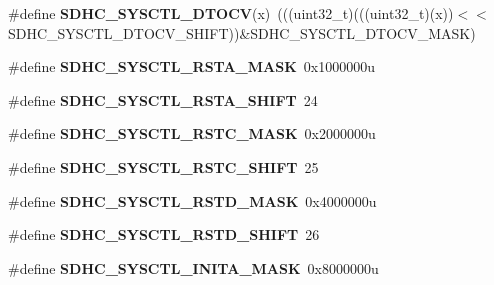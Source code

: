 \begin{DoxyCompactItemize}
\item 
\#define {\bfseries S\+D\+H\+C\+\_\+\+S\+Y\+S\+C\+T\+L\+\_\+\+D\+T\+O\+CV}(x)~(((uint32\+\_\+t)(((uint32\+\_\+t)(x))$<$$<$S\+D\+H\+C\+\_\+\+S\+Y\+S\+C\+T\+L\+\_\+\+D\+T\+O\+C\+V\+\_\+\+S\+H\+I\+FT))\&S\+D\+H\+C\+\_\+\+S\+Y\+S\+C\+T\+L\+\_\+\+D\+T\+O\+C\+V\+\_\+\+M\+A\+SK)\hypertarget{group__SDHC__Register__Masks_ga1e1110144cc16dd7711f8acbd1bfd8b3}{}\label{group__SDHC__Register__Masks_ga1e1110144cc16dd7711f8acbd1bfd8b3}

\item 
\#define {\bfseries S\+D\+H\+C\+\_\+\+S\+Y\+S\+C\+T\+L\+\_\+\+R\+S\+T\+A\+\_\+\+M\+A\+SK}~0x1000000u\hypertarget{group__SDHC__Register__Masks_gab4c8c72837143c46d7c36342c494b4ad}{}\label{group__SDHC__Register__Masks_gab4c8c72837143c46d7c36342c494b4ad}

\item 
\#define {\bfseries S\+D\+H\+C\+\_\+\+S\+Y\+S\+C\+T\+L\+\_\+\+R\+S\+T\+A\+\_\+\+S\+H\+I\+FT}~24\hypertarget{group__SDHC__Register__Masks_gaa5f5e5f66dea7902c53a8cb01ec27fbb}{}\label{group__SDHC__Register__Masks_gaa5f5e5f66dea7902c53a8cb01ec27fbb}

\item 
\#define {\bfseries S\+D\+H\+C\+\_\+\+S\+Y\+S\+C\+T\+L\+\_\+\+R\+S\+T\+C\+\_\+\+M\+A\+SK}~0x2000000u\hypertarget{group__SDHC__Register__Masks_ga10f1184a683dcb78737e3620660d6b62}{}\label{group__SDHC__Register__Masks_ga10f1184a683dcb78737e3620660d6b62}

\item 
\#define {\bfseries S\+D\+H\+C\+\_\+\+S\+Y\+S\+C\+T\+L\+\_\+\+R\+S\+T\+C\+\_\+\+S\+H\+I\+FT}~25\hypertarget{group__SDHC__Register__Masks_ga3d422fd7f88100a1e5ec873d8d670792}{}\label{group__SDHC__Register__Masks_ga3d422fd7f88100a1e5ec873d8d670792}

\item 
\#define {\bfseries S\+D\+H\+C\+\_\+\+S\+Y\+S\+C\+T\+L\+\_\+\+R\+S\+T\+D\+\_\+\+M\+A\+SK}~0x4000000u\hypertarget{group__SDHC__Register__Masks_ga920797e969967edc2e737c8db7ce92aa}{}\label{group__SDHC__Register__Masks_ga920797e969967edc2e737c8db7ce92aa}

\item 
\#define {\bfseries S\+D\+H\+C\+\_\+\+S\+Y\+S\+C\+T\+L\+\_\+\+R\+S\+T\+D\+\_\+\+S\+H\+I\+FT}~26\hypertarget{group__SDHC__Register__Masks_ga1997ff19d3faec07899352f7ca6c0ad8}{}\label{group__SDHC__Register__Masks_ga1997ff19d3faec07899352f7ca6c0ad8}

\item 
\#define {\bfseries S\+D\+H\+C\+\_\+\+S\+Y\+S\+C\+T\+L\+\_\+\+I\+N\+I\+T\+A\+\_\+\+M\+A\+SK}~0x8000000u\hypertarget{group__SDHC__Register__Masks_ga2a115ba3d13885e273f8113ee502beb3}{}\label{group__SDHC__Register__Masks_ga2a115ba3d13885e273f8113ee502beb3}


\end{DoxyCompactItemize}
